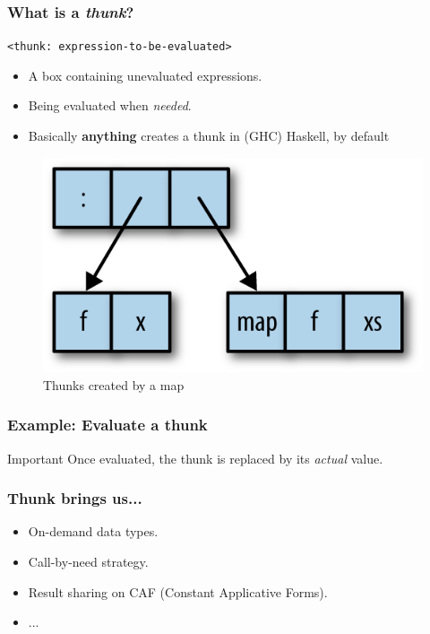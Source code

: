 \documentclass{beamer}
\newcommand{\inlinehaskell}[1]{\texttt{#1}}
\begin{document}
\begin{frame}
\frametitle{What is a \textit{thunk}?}
\inlinehaskell{<thunk: expression-to-be-evaluated>}
\begin{itemize}
    \item A box containing unevaluated expressions.
    \item Being evaluated when \textit{needed}.
    \item Basically \textbf{anything} creates a thunk in (GHC) Haskell, by default
\end{itemize}

\begin{figure}[hbt!]
\begin{center}
\includegraphics[height=0.4\textheight]{./pic/thunk-map.png}
\caption{Thunks created by a map}
\end{center}
\end{figure}
\end{frame}


\begin{frame}
\frametitle{Example: Evaluate a thunk}
\begin{block}{Important}
Once evaluated, the thunk is replaced by its \textit{actual} value.
\end{block}
\end{frame}


\begin{frame}
\frametitle{Thunk brings us...}
\begin{itemize}
    \item On-demand data types.
    \item Call-by-need strategy.
    \item Result sharing on CAF (Constant Applicative Forms).
    \item ...
\end{itemize}\bigskip
{}
\end{frame}
\end{document}
